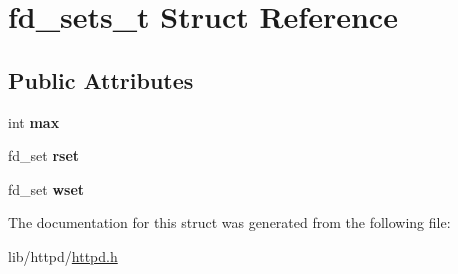 \hypertarget{structfd__sets__t}{}\section{fd\+\_\+sets\+\_\+t Struct Reference}
\label{structfd__sets__t}
\subsection*{Public Attributes}
\begin{DoxyCompactItemize}
\item 
\mbox{\label{structfd__sets__t_a7ff7ae153d4d1029835242522591c255}} 
int {\bfseries max}
\item 
\mbox{\label{structfd__sets__t_a522141a7a01c484a7a95d18b4913f093}} 
fd\+\_\+set {\bfseries rset}
\item 
\mbox{\label{structfd__sets__t_af96615f7cd29f97271f5f635d2f07e9c}} 
fd\+\_\+set {\bfseries wset}
\end{DoxyCompactItemize}


The documentation for this struct was generated from the following file\+:\begin{DoxyCompactItemize}
\item 
lib/httpd/\hyperlink{httpd_8h}{httpd.\+h}\end{DoxyCompactItemize}

